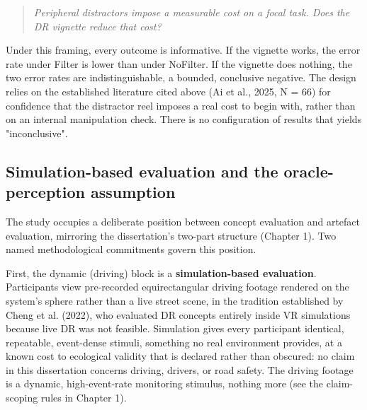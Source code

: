 \begin{quote}
\textit{Peripheral distractors impose a measurable cost on a focal task. Does the DR vignette reduce that
cost?}
\end{quote}

Under this framing, every outcome is informative. If the vignette works, the error rate under Filter
is lower than under NoFilter. If the vignette does nothing, the two error rates are indistinguishable,
a bounded, conclusive negative. The design relies on the established literature cited above (Ai et
al., 2025, N = 66) for confidence that the distractor reel imposes a real cost to begin with, rather
than on an internal manipulation check. There is no configuration of results that yields
"inconclusive".

\subsection{Simulation-based evaluation and the oracle-perception assumption}

The study occupies a deliberate position between concept evaluation and artefact evaluation, mirroring
the dissertation's two-part structure (Chapter 1). Two named methodological commitments govern this
position.

First, the dynamic (driving) block is a \textbf{simulation-based evaluation}. Participants view
pre-recorded equirectangular driving footage rendered on the system's sphere rather than a live street
scene, in the tradition established by Cheng et al. (2022), who evaluated DR concepts entirely inside
VR simulations because live DR was not feasible. Simulation gives every participant identical,
repeatable, event-dense stimuli, something no real environment provides, at a known cost to
ecological validity that is declared rather than obscured: no claim in this dissertation concerns
driving, drivers, or road safety. The driving footage is a dynamic, high-event-rate monitoring
stimulus, nothing more (see the claim-scoping rules in Chapter 1).

